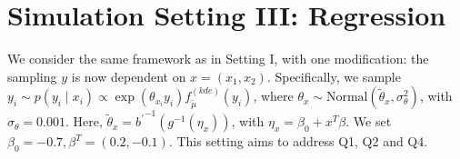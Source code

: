 \documentclass[10pt, oneside]{article}   	%
\newcommand{\tmu}{\widetilde{\mu}}
\begin{document}
\section{Simulation Setting III: Regression} 
We consider the same framework as in Setting I, with one modification: the sampling $y$ is now dependent on $x = (x_1, x_2)$. Specifically, we sample $y_i \sim p(y_i \mid x_i) \propto \exp(\theta_{x_i} y_i)f^{(kde)}_{\tmu}(y_i)$, where $\theta_x \sim \text{Normal}(\widetilde \theta_x, \sigma^2_\theta)$, with $\sigma_\theta = 0.001$. Here, $\widetilde \theta_x = {b^\prime}^{-1}(g^{-1}(\eta_x))$, with $\eta_x = \beta_0 + x^T\beta$. We set $\beta_0 = -0.7, \beta^T = (0.2, -0.1)$. This setting aims to address Q1, Q2 and Q4.
\end{document}
